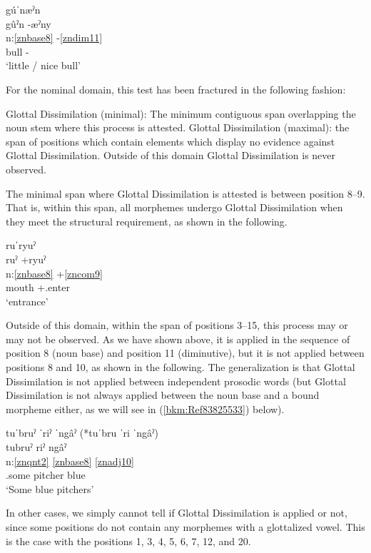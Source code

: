 \documentclass[output=paper]{langscibook}
\begin{document}
\ea\label{ex:key:zap:117}
{gúˈnæˀn}\\
\glll gûˀn -æˀny\\
n:\ref{znbase8}  -\ref{zndim11}\\
bull -\Dim{}\\
\glt `little / nice bull'
\z

For the nominal domain, this test has been fractured in the following fashion:

\ea Glottal Dissimilation (minimal): The minimum contiguous span overlapping the noun stem where this process is attested.
\ex Glottal Dissimilation (maximal): the span of positions which contain elements which display no evidence against Glottal Dissimilation. Outside of this domain Glottal Dissimilation is never observed.
\z


The minimal span where Glottal Dissimilation is attested is between position 8--9. That is, within this span, all morphemes undergo Glottal Dissimilation when they meet the structural requirement, as shown in the following.

\ea\label{ex:key:zap:120}
{ruˈryuˀ}\\
\glll ruˀ +ryuˀ \\
n:\ref{znbase8}  +\ref{zncom9} \\
mouth +\Hab{}.enter\\
\glt `entrance'
\z

Outside of this domain, within the span of positions 3--15, this process may or may not be observed. As we have shown above, it is applied in the sequence of position 8 (noun base) and position 11 (diminutive), but it is not applied between positions 8 and 10, as shown in the following. The generalization is that Glottal Dissimilation is not applied between independent prosodic words (but Glottal Dissimilation is not always applied between the noun base and a bound morpheme either, as we will see in (\ref{bkm:Ref83825533}) below).

\ea\label{ex:key:zap:121}
{tuˈbruˀ ˈriˀ ˈngâˀ (*tuˈbru ˈri ˈngâˀ)}\\
\glll tubruˀ riˀ ngâˀ\\
n:\ref{znqnt2} \ref{znbase8} \ref{znadj10} \\
\Qr{}.some pitcher blue\\
\glt `Some blue pitchers'
\z

In other cases, we simply cannot tell if Glottal Dissimilation is applied or not, since some positions do not contain any morphemes with a glottalized vowel. This is the case with the positions 1, 3, 4, 5, 6, 7, 12, and 20. 
\end{document}
